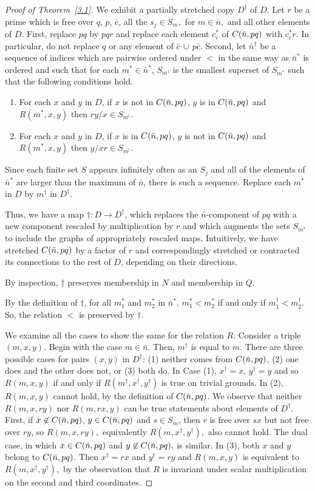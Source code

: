 \documentclass[12pt,fullpage]{article}
\theoremstyle{definition}
\theoremstyle{remark}
\begin{document}
\begin{proof}[Proof of Theorem~\ref{3.1}]
We exhibit a partially stretched copy $D^\dagger$ of $D$.  Let $r$ be a prime which is free over $q$, $p$, $\bar{c}$, all the $s_j\in S_m,$ for $m\in\bar{n},$ and all other elements of $D$.   First, replace $pq$ by $pqr$ and replace each element $c_i^*$ of $C(\bar{n},pq)$ with $c^*_ir$.  In particular, do not replace $q$ or any element of $\bar{c}\,\cup\,p\bar{c}.$  Second, let $\bar{n}^{\dagger}$ be a sequence of indices which are pairwise ordered under $<$ in the same way as $\bar{n}^*$ is ordered and such that for each $m^*\in\bar{n}^*$, 
$S_{m^{\dagger}}$ is the smallest superset of $S_{m^*}$ such that the following conditions hold.
  \begin{enumerate}
  \item For each $x$ and $y$ in $D$, if $x$ is not in $C(\bar{n},pq)$, $y$ is in $C(\bar{n},pq)$ and $R(m^*,x,y)$ then $ry/x\in S_{m^{\dagger}}$.
  \item For each $x$ and $y$ in $D$, if $x$ is in $C(\bar{n},pq)$, $y$ is not in $C(\bar{n},pq)$ and $R(m^*,x,y)$ then $y/xr\in S_{m^{\dagger}}$.
    \end{enumerate}
Since each finite set $S$ appears infinitely often as an $S_j$ and all of the elements of $\bar{n}^*$ are larger than the maximum of $\bar{n}$, there is such a sequence. Replace each $m^*$ in $D$ by $m^{\dagger}$ in $D^\dagger$.
   
 
Thus, we have a map $\dagger:D\to D^\dagger$, which replaces the $\bar{n}$-component of $pq$ with a new component rescaled by multiplication by $r$ and which augments the sets $S_{m^*}$ to include the graphs of appropriately rescaled maps.  Intuitively, we have stretched $C(\bar{n},pq)$ by a factor of $r$ and correspondingly stretched or contracted its connections to the rest of $D$, depending on their directions.

By inspection, $\dagger$ preserves membership in $N$ and membership in $Q$.

By the definition of  $\dagger$, for all $m_1^*$ and $m_2^*$ in $\bar{n}^*$,  $m^*_1<m^*_2$ if and only if $m^{\dagger}_1<m^{\dagger}_2.$  So, the relation $<$ is preserved by $\dagger$.

We examine all the cases to show the same for the relation $R$.  Consider a triple $(m,x,y)$.  Begin with the case $m\in\bar{n}$.  Then, $m^\dagger$ is equal to $m$.  There are three possible cases for pairs $(x,y)$ in $D^\dagger$: (1) neither comes from $C(\bar{n},pq)$,   (2) one does and the other does not, or (3) both do.    In Case (1), $x^\dagger=x$, $y^\dagger=y$ and so $R(m,x,y)$ if and only if $R(m^\dagger,x^\dagger,y^\dagger)$ is true on trivial grounds.  In (2), $R(m,x,y)$ cannot hold, by the definition of $C(\bar{n},pq)$.  We observe that neither $R(m,x,ry)$ nor $R(m,rx,y)$ can be true statements about elements of $D^\dagger$.  First, if $x\not\in C(\bar{n},pq)$, $y\in C(\bar{n},pq)$  and $s\in S_m$, then $r$ is free over $sx$ but not free over $ry$, so $R(m,x,ry),$ equivalently $R(m,x^\dagger,y^\dagger),$
also cannot hold.  The dual case, in which $x\in C(\bar{n},pq)$ and $y\not\in C(\bar{n},pq),$ is similar.  In (3),  both $x$ and $y$ belong to $C(\bar{n},pq)$.
Then $x^\dagger=rx$ and $y^\dagger=ry$ and $R(m,x,y)$ is equivalent to $R(m,x^\dagger,y^\dagger),$ by the observation that $R$ is invariant under scalar multiplication on the second and third coordinates.  


\end{proof}
\end{document}
